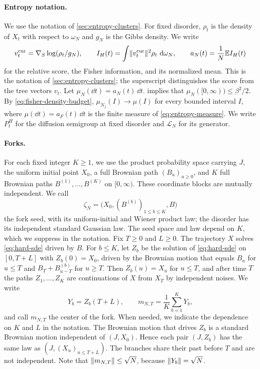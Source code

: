 \paragraph{Entropy notation.}
We use the notation of \cref{sec:entropy-clusters}. For fixed disorder,
$\rho_t$ is the density of $X_t$ with respect to $\omega_N$ and $g_N$ is the
Gibbs density. We write
\[
 v^{\mathrm{cur}}_t=\nabla_S\log(\rho_t/g_N),\qquad
 I_H(t)=\int\lVert v^{\mathrm{cur}}_t\rVert^2\rho_t\,\mathop{}\!\mathrm d\omega_N,\qquad
 a_N(t)=\frac1N\mathbb E I_H(t)
\]
for the relative score, the Fisher information, and its normalized mean.
This is the notation of \cref{sec:entropy-clusters}; the superscript
distinguishes the score from the tree vectors $v_t$. Let $\mu_N(\dd t)=a_N(t)\,\dd t$.  implies that
$\mu_N([0,\infty))\le\beta^2/2$. By \eqref{eq:fisher-density-budget},
$\mu_{N_j}(I)\to\mu(I)$ for every
bounded interval $I$, where $\mu(\dd t)=a_F(t)\,\dd t$ is the finite measure
of \eqref{eq:entropy-measure}. We write $P^H_t$ for the diffusion
semigroup at fixed disorder and $\mathcal L_N$ for its generator.

\paragraph{Forks.}
For each fixed integer $K\ge1$, we use the product probability space
carrying $J$, the uniform initial point $X_0$, a full Brownian path
$(B_u)_{u\ge0}$, and $K$ full Brownian paths $B^{(1)},\dots,B^{(K)}$
on $[0,\infty)$. These coordinate blocks are mutually independent. We call
\[
 \zeta_N=\big(X_0,(B^{(b)})_{1\le b\le K},B\big)
\]
the fork seed, with its uniform-initial and Wiener product law; the
disorder has its independent standard Gaussian law. The seed space and law
depend on $K$, which we suppress in the notation. Fix $T\ge0$ and $L\ge0$. The trajectory $X$
solves \eqref{eq:hard-sde} driven by $B$. For $b\le K$, let $Z_b$ be the
solution of \eqref{eq:hard-sde} on $[0,T+L]$ with $Z_b(0)=X_0$, driven by
the Brownian motion that equals $B_u$ for $u\le T$ and
$B_T+B^{(b)}_{u-T}$ for $u\ge T$. Then $Z_b(u)=X_u$ for $u\le T$, and after
time $T$ the paths $Z_1,\dots,Z_K$ are continuations of $X$ from $X_T$ by
independent noises. We write
\[
 Y_b=Z_b(T+L),\qquad m_{N,T}=\frac1K\sum_{b=1}^KY_b,
\]
and call $m_{N,T}$ the center of the fork. When needed, we indicate the
dependence on $K$ and $L$ in the notation. The Brownian motion that drives
$Z_b$ is a standard Brownian motion independent of $(J,X_0)$. Hence each
pair $(J,Z_b)$ has the same law as $(J,(X_u)_{u\le T+L})$. The branches
share their past before $T$ and are not independent. Note that $\lVert m_{N,T}\rVert\le\sqrt N$, because
$\lVert Y_b\rVert=\sqrt N$.

